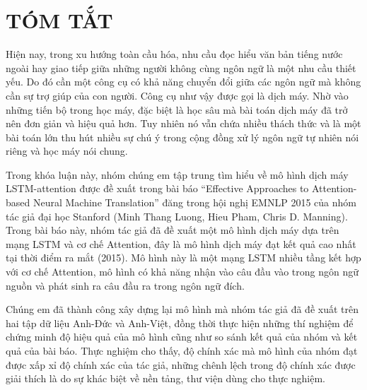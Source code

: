 \newpage
\chapter*{TÓM TẮT}

 Hiện nay, trong xu hướng toàn cầu hóa, nhu cầu đọc hiểu văn bản tiếng nước ngoài hay giao tiếp giữa những người không cùng ngôn ngữ là một nhu cầu thiết yếu. Do đó cần một công cụ có khả năng chuyển đổi giữa các ngôn ngữ mà không cần sự trợ giúp của con người. Công cụ như vậy được gọi là dịch máy. Nhờ vào những tiến bộ trong học máy, đặc biệt là học sâu mà bài toán dịch máy đã trở nên đơn giản và hiệu quả hơn. Tuy nhiên nó vẫn chứa nhiều thách thức và là một bài toán lớn thu hút nhiều sự chú ý trong cộng đồng xử lý ngôn ngữ tự nhiên nói riêng và học máy nói chung.
 
 Trong khóa luận này, nhóm chúng em tập trung tìm hiểu về mô hình dịch máy LSTM-attention được đề xuất trong bài báo “Effective Approaches to Attention-based Neural Machine Translation” đăng trong hội nghị EMNLP 2015 của nhóm tác giả đại học Stanford (Minh Thang Luong, Hieu Pham, Chris D. Manning). Trong bài báo này, nhóm tác giả đã đề xuất một mô hình dịch máy dựa trên mạng LSTM và cơ chế Attention, đây là mô hình dịch máy đạt kết quả cao nhất tại thời điểm ra mắt (2015). Mô hình này là một mạng LSTM nhiều tầng kết hợp với cơ chế Attention, mô hình có khả năng nhận vào câu đầu vào trong ngôn ngữ nguồn và phát sinh ra câu đầu ra trong ngôn ngữ đích. 
 
 Chúng em đã thành công xây dựng lại mô hình mà nhóm tác giả đã đề xuất trên hai tập dữ liệu Anh-Đức và Anh-Việt, đồng thời thực hiện những thí nghiệm để chứng minh độ hiệu quả của mô hình cũng như so sánh kết quả của nhóm và kết quả của bài báo. Thực nghiệm cho thấy, độ chính xác mà mô hình của nhóm đạt được xấp xỉ độ chính xác của tác giả, những chênh lệch trong độ chính xác được giải thích là do sự khác biệt về nền tảng, thư viện dùng cho thực nghiệm.
 